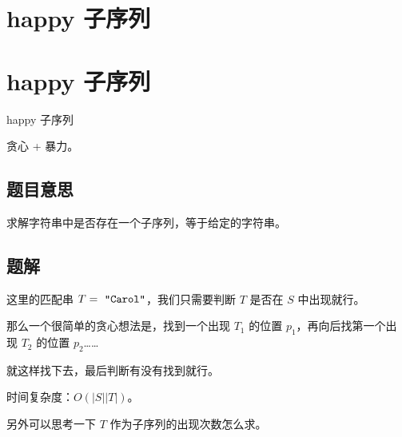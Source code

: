 \def\sectionName{happy 子序列}



\isBeamerMode\relax
    \section[\TOCName]{\sectionName}
\fi
\isBeamerMode\relax
    \section[\TOCName\ -\ \sectionName]{\sectionName}
\fi

\begin{frame}

\isBeamerMode\relax
    {\Huge \sectionName}\par
\fi




贪心 + 暴力。



\end{frame}

\subsection{题目意思}
\begin{frame} %
求解字符串中是否存在一个子序列，等于给定的字符串。
\end{frame}



\subsection{题解}
\begin{frame} %
这里的匹配串 $T = \text{ \texttt{"Carol"}}$，我们只需要判断 $T$ 是否在 $S$ 中出现就行。

那么一个很简单的贪心想法是，找到一个出现 $T_1$ 的位置 $p_1$，再向后找第一个出
现 $T_2$ 的位置 $p_2$……

就这样找下去，最后判断有没有找到就行。

时间复杂度：$O(|S||T|)$。

另外可以思考一下 $T$ 作为子序列的出现次数怎么求。
\end{frame}
